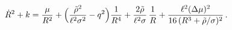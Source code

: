 \begin{equation}
\dot{R}^2+k=\frac{\mu}{R^2} + 
\Bigl(\frac{\tilde{\rho}^2}{\ell^2 \sigma^2}-q^2\Bigr)\frac{1}{R^4}
+ \frac{2\tilde{\rho}}{\ell^2\sigma}\,\frac{1}{R}
+\frac{\ell^2(\Delta\mu)^2}{16\,(R^3 +\tilde{\rho}/\sigma)^2}\,.
\end{equation}

